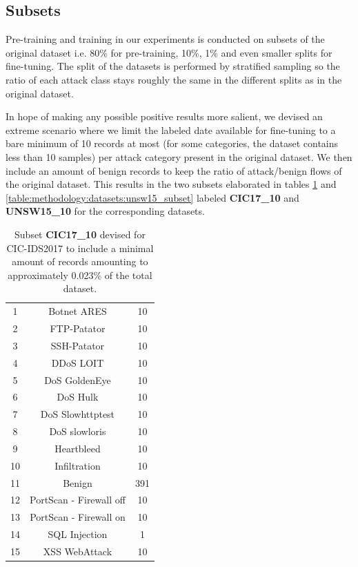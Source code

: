 \subsection{Subsets} \label{sec:methodology:subsets}

Pre-training and training in our experiments is conducted on subsets of the original dataset i.e. 80\% for pre-training, 10\%, 1\% and even smaller splits for fine-tuning. The split of the datasets is performed by stratified sampling so the ratio of each attack class stays roughly the same in the different splits as in the original dataset. \par

In hope of making any possible positive results more salient, we devised an extreme scenario where we limit the labeled date available for fine-tuning to a bare minimum of 10 records at most (for some categories, the dataset contains less than 10 samples) per attack category present in the original dataset. We then include an amount of benign records to keep the ratio of attack/benign flows of the original dataset. This results in the two subsets elaborated in tables \ref{table:methodology:datasets:cic17_subset} and \ref{table:methodology:datasets:unsw15_subset} labeled \textbf{CIC17\_10} and \textbf{UNSW15\_10} for the corresponding datasets.

\begin{table}[H]
	\centering
	\begin{tabular}{ccc}
		\thead{\textbf{\#}} & \thead{\textbf{Class}} & \thead{\textbf{No. Records}} \\ \hline \midrule
		1  & Botnet ARES             & 10  \\
		2  & FTP-Patator             & 10  \\
		3  & SSH-Patator             & 10  \\
		4  & DDoS LOIT               & 10  \\
		5  & DoS GoldenEye           & 10  \\
		6  & DoS Hulk                & 10  \\
		7  & DoS Slowhttptest        & 10  \\
		8  & DoS slowloris           & 10  \\
		9  & Heartbleed              & 10  \\
		10  & Infiltration            & 10  \\
		11 & Benign                  & 391 \\
		12 & PortScan - Firewall off & 10  \\
		13 & PortScan - Firewall on  & 10  \\
		14 & SQL Injection           & 1   \\
		15 & XSS WebAttack           & 10                    
	\end{tabular}
	\caption{Subset \textbf{CIC17\_10} devised for CIC-IDS2017 to include a minimal amount of records amounting to approximately 0.023\% of the total dataset.}
	\label{table:methodology:datasets:cic17_subset}
\end{table}

